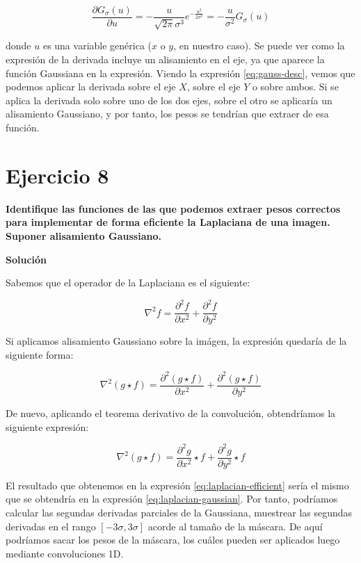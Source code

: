 \documentclass[11pt,a4paper]{article}
\newcommand{\answer}{\noindent\textbf{Solución}}
\newcommand{\question}[1]{\noindent\textbf{#1}}
\newcommand{\nonumbersection}[1]{\section*{#1}\addcontentsline{toc}{section}{#1}}
\begin{document}
\begin{equation}
	\frac{\partial G_\sigma(u)}{\partial u} = -\frac{u}{\sqrt{2\pi}\sigma^3}e^{-\frac{u^2}{2\sigma^2}}
	= -\frac{u}{\sigma^2}G_\sigma(u)
\end{equation}

\noindent donde $u$ es una variable genérica ($x$ o $y$, en nuestro caso). Se puede ver como la expresión de la derivada
incluye un alisamiento en el eje, ya que aparece la función Gaussiana en la expresión. Viendo la expresión \eqref{eq:gauss-desc},
vemos que podemos aplicar la derivada sobre el eje $X$, sobre el eje $Y$ o sobre ambos. Si se aplica la derivada solo sobre
uno de los dos ejes, sobre el otro se aplicaría un alisamiento Gaussiano, y por tanto, los pesos se tendrían que extraer de
esa función.

\nonumbersection{Ejercicio 8}

\question{Identifique las funciones de las que podemos extraer pesos correctos
para implementar de forma eficiente la Laplaciana de una imagen. Suponer
alisamiento Gaussiano.}

\answer

Sabemos que el operador de la Laplaciana es el siguiente:

\begin{equation}
	\nabla^2 f = \frac{\partial^2f}{\partial x^2} + \frac{\partial^2f}{\partial y^2}
\end{equation}

Si aplicamos alisamiento Gaussiano sobre la imágen, la expresión quedaría de la siguiente forma:

\begin{equation}
\label{eq:laplacian-gaussian}
	\nabla^2 (g \star f) = \frac{\partial^2(g \star f)}{\partial x^2} + \frac{\partial^2(g \star f)}{\partial y^2}
\end{equation}

De nuevo, aplicando el teorema derivativo de la convolución, obtendríamos la siguiente expresión:

\begin{equation}
\label{eq:laplacian-efficient}
	\nabla^2 (g \star f) = \frac{\partial^2g}{\partial x^2} \star f + \frac{\partial^2g}{\partial y^2} \star f
\end{equation}

El resultado que obtenemos en la expresión \eqref{eq:laplacian-efficient} sería el mismo que se obtendría en
la expresión \eqref{eq:laplacian-gaussian}. Por tanto, podríamos calcular las segundas derivadas parciales de la Gaussiana,
muestrear las segundas derivadas en el rango $[-3\sigma, 3\sigma]$ acorde al tamaño de la máscara. De aquí podríamos
sacar los pesos de la máscara, los cuáles pueden ser aplicados luego mediante convoluciones 1D.
\end{document}
